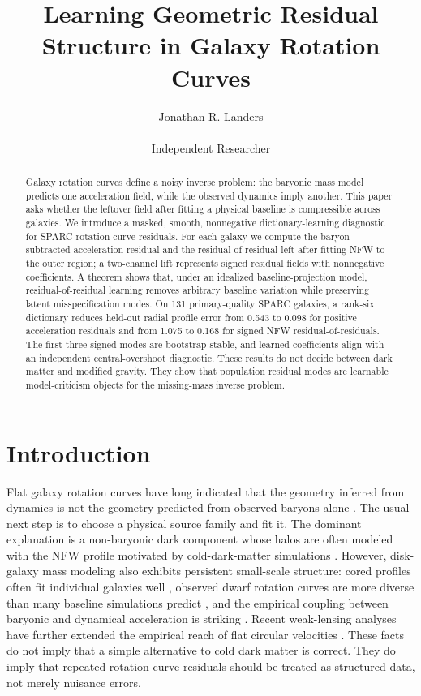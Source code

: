 \documentclass[10pt,twocolumn]{article}
\title{\vspace{-1.2em}Learning Geometric Residual Structure in Galaxy Rotation Curves}
\author{
Jonathan R. Landers\\[-0.2em]
\small \orcidlink{\AuthorORCID}\,
\href{https://orcid.org/\AuthorORCID}{\AuthorORCID}\\[-0.25em]
\small Independent Researcher
}
\date{\vspace{-0.8em}}
\begin{document}
\maketitle
\vspace{-1.25em}

\begin{abstract}
Galaxy rotation curves define a noisy inverse problem: the baryonic mass model
predicts one acceleration field, while the observed dynamics imply another.
This paper asks whether the leftover field after fitting a physical baseline is
compressible across galaxies. We introduce a masked, smooth, nonnegative
dictionary-learning diagnostic for SPARC rotation-curve residuals. For each
galaxy we compute the baryon-subtracted acceleration residual and the
residual-of-residual left after fitting NFW to the outer region; a two-channel
lift represents signed residual fields with nonnegative coefficients. A theorem
shows that, under an idealized baseline-projection model,
residual-of-residual learning removes arbitrary baseline variation while
preserving latent misspecification modes. On 131 primary-quality SPARC
galaxies, a rank-six dictionary reduces held-out radial profile error from
0.543 to 0.098 for positive acceleration residuals and from 1.075 to 0.168 for
signed NFW residual-of-residuals. The first three signed modes are
bootstrap-stable, and learned coefficients align with an independent
central-overshoot diagnostic. These results do not decide between dark matter
and modified gravity. They show that population residual modes are learnable
model-criticism objects for the missing-mass inverse problem.
\end{abstract}

\section{Introduction}

Flat galaxy rotation curves have long indicated that the geometry inferred from
dynamics is not the geometry predicted from observed baryons alone
\citep{Rubin1980,Bertone2018}. The usual next step is to choose a physical
source family and fit it. The dominant explanation is a non-baryonic dark
component whose halos are often modeled with the NFW profile motivated by
cold-dark-matter simulations \citep{Navarro1996,Navarro1997}.
However, disk-galaxy mass modeling also exhibits persistent small-scale
structure: cored profiles often fit individual galaxies well
\citep{Burkert1995,deBlok2010}, observed dwarf rotation curves are more diverse
than many baseline simulations predict \citep{Oman2015,Bullock2017}, and the
empirical coupling between baryonic and dynamical acceleration is striking
\citep{McGaugh2016,Famaey2012}. Recent weak-lensing analyses have further
extended the empirical reach of flat circular velocities
\citep{Mistele2024}. These facts do not imply that a simple alternative to
cold dark matter is correct. They do imply that repeated rotation-curve
residuals should be treated as structured data, not merely nuisance errors.
\end{document}
